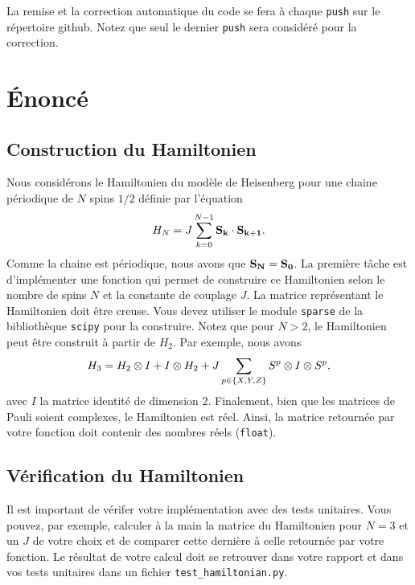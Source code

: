 \documentclass[12pt, letterpaper]{article}
\begin{document}
\bigskip

\noindent La remise et la correction automatique du code se fera à chaque \texttt{push} sur le répertoire github.
Notez que seul le dernier \texttt{push} sera considéré pour la correction.


\section{Énoncé}\label{sec:enonce}

\subsection{Construction du Hamiltonien}\label{subsec:construction-du-hamiltonien}

\noindent Nous considérons le Hamiltonien du modèle de Heisenberg pour une chaine périodique de
$N$ spins $1/2$ définie par l'équation
\begin{equation}
  H_N = J \sum_{k=0}^{N-1} \vb{S_k} \cdot \vb{S_{k+1}}.
\end{equation}
Comme la chaine est périodique, nous avons que $\vb{S_N} = \vb{S_0}$.
La première tâche est d'implémenter une fonction qui permet de construire
ce Hamiltonien selon le nombre de spins $N$ et la constante de couplage $J$.
La matrice représentant le Hamiltonien doit être creuse.
Vous devez utiliser le module \texttt{sparse} de la bibliothèque \texttt{scipy}
pour la construire.
Notez que pour $N > 2$, le Hamiltonien peut être construit à partir de $H_2$.
Par exemple, nous avons
\begin{equation}
  H_3 = H_2 \otimes I + I \otimes H_2 + J\sum_{p\in\qty{X, Y, Z}} S^p \otimes I \otimes S^p,
\end{equation}
avec $I$ la matrice identité de dimension 2.
Finalement, bien que les matrices de Pauli soient complexes,
le Hamiltonien est réel.
Ainsi, la matrice retournée par votre fonction doit contenir des nombres
réels (\texttt{float}).

\subsection{Vérification du Hamiltonien}\label{subsec:verification-du-hamiltonien}

\noindent Il est important de vérifer votre implémentation avec des tests unitaires.
Vous pouvez, par exemple, calculer à la main la matrice du Hamiltonien pour
$N = 3$ et un $J$ de votre choix et de comparer cette dernière à celle retournée par
votre fonction.
Le résultat de votre calcul doit se retrouver dans votre rapport et dans vos tests unitaires dans
un fichier \texttt{test\_hamiltonian.py}.
\end{document}
